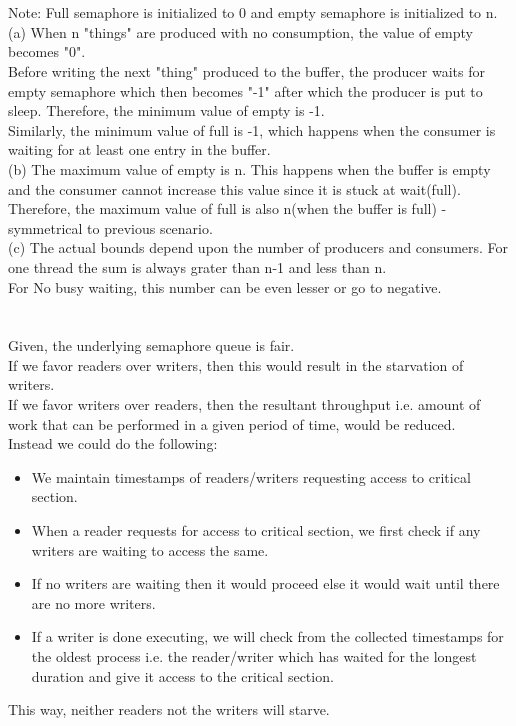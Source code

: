 \documentclass[12pt]{article}
\begin{document}
\maketitle

\section{}
Note: Full semaphore is initialized to 0 and empty semaphore is initialized to n.
(a) When n "things" are produced with no consumption,
the value of empty becomes "0".\\
Before writing the next "thing" produced to the buffer, the producer waits for empty semaphore which then becomes "-1" after which the producer is put to sleep. Therefore, the minimum value of empty is -1.\\
Similarly, the minimum value of full is -1, which happens when the
consumer is waiting for at least one entry in the buffer.\\
(b) The maximum value of empty is n. This happens when the buffer is empty and the consumer
cannot increase this value since it is stuck at wait(full).\\
Therefore, the maximum value of full is also n(when the buffer is full) - symmetrical to previous scenario.\\
(c) The actual bounds depend upon the number of producers and
consumers. For one thread the sum is always grater than n-1 and less than n.\\
For No busy waiting, this number can be even lesser or go to negative.\\

\section{}
Given, the underlying semaphore queue is fair.\\
If we favor readers over writers, then this would result in the starvation of writers.\\
If we favor writers over readers, then the resultant throughput i.e. amount of work that can be performed in a given period of time, would be reduced.\\
Instead we could do the following:\\
\begin{itemize}
\item We maintain timestamps of readers/writers requesting access to critical section.
\item When a reader requests for access to critical section, we first check if any writers are waiting to access the same.\\
\item If no writers are waiting then it would proceed else it would wait until there are no more writers.
\item If a writer is done executing, we will check from the collected timestamps for the oldest process i.e. the reader/writer which has waited for the longest duration and give it access to the critical section.\\
\end{itemize}
This way, neither readers not the writers will starve.
\end{document}
